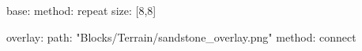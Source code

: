 base:
  method: repeat
  size: [8,8]

overlay:
  path: "Blocks/Terrain/sandstone_overlay.png"
  method: connect